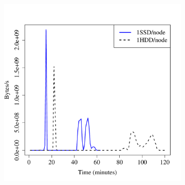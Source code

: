 \documentclass[conference]{IEEEtran}
\begin{document}
\begin{figure}[htb]
        \begin{subfigure}[b]{0.23\textwidth}
                \includegraphics[width=\textwidth]{Figure/SystemData/Plots/BGHddSsdHdfsWrIops.pdf}

\end{subfigure}
\end{figure}
\end{document}
